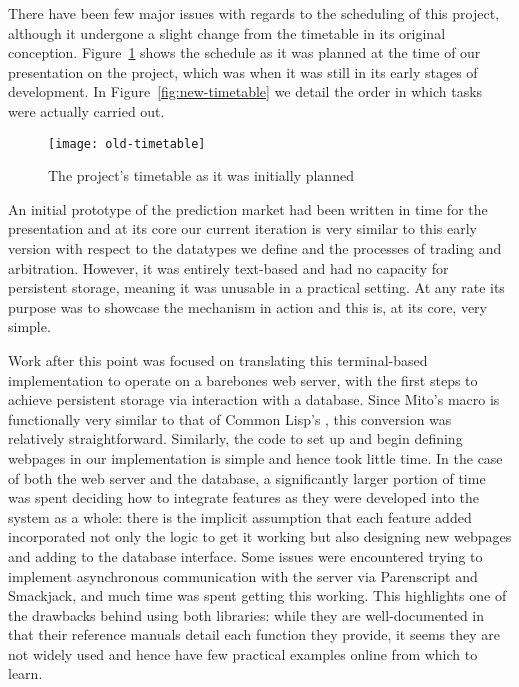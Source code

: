 There have been few major issues with regards to the scheduling of this
project, although it undergone a slight change from the timetable in its
original conception. Figure~\ref{fig:old-timetable} shows the schedule as it
was planned at the time of our presentation on the project, which was when it
was still in its early stages of development. In Figure~\ref{fig:new-timetable}
we detail the order in which tasks were actually carried out.

\begin{figure}[h]
	\centering
	\texttt{[image: old-timetable]}
	\caption{The project's timetable as it was initially planned}
	\label{fig:old-timetable}
\end{figure}

An initial prototype of the prediction market had been written in time for the
presentation and at its core our current iteration is very similar to this
early version with respect to the datatypes we define and the processes of
trading and arbitration. However, it was entirely text-based and had no
capacity for persistent storage, meaning it was unusable in a practical
setting. At any rate its purpose was to showcase the mechanism in action and
this is, at its core, very simple. 

Work after this point was focused on translating this terminal-based
implementation to operate on a barebones web server, with the first steps to
achieve persistent storage via interaction with a database. Since Mito's
 macro is functionally very similar to that of Common Lisp's
, this conversion was relatively straightforward. Similarly,
the code to set up and begin defining webpages in our implementation is simple
and hence took little time. In the case of both the web server and the
database, a significantly larger portion of time was spent deciding how to
integrate features as they were developed into the system as a whole: there is
the implicit assumption that each feature added incorporated not only the logic
to get it working but also designing new webpages and adding to the database
interface. Some issues were encountered trying to implement asynchronous
communication with the server via Parenscript and Smackjack, and much time was
spent getting this working. This highlights one of the drawbacks behind using
both libraries: while they are well-documented in that their reference manuals
detail each function they provide, it seems they are not widely used and hence
have few practical examples online from which to learn.

